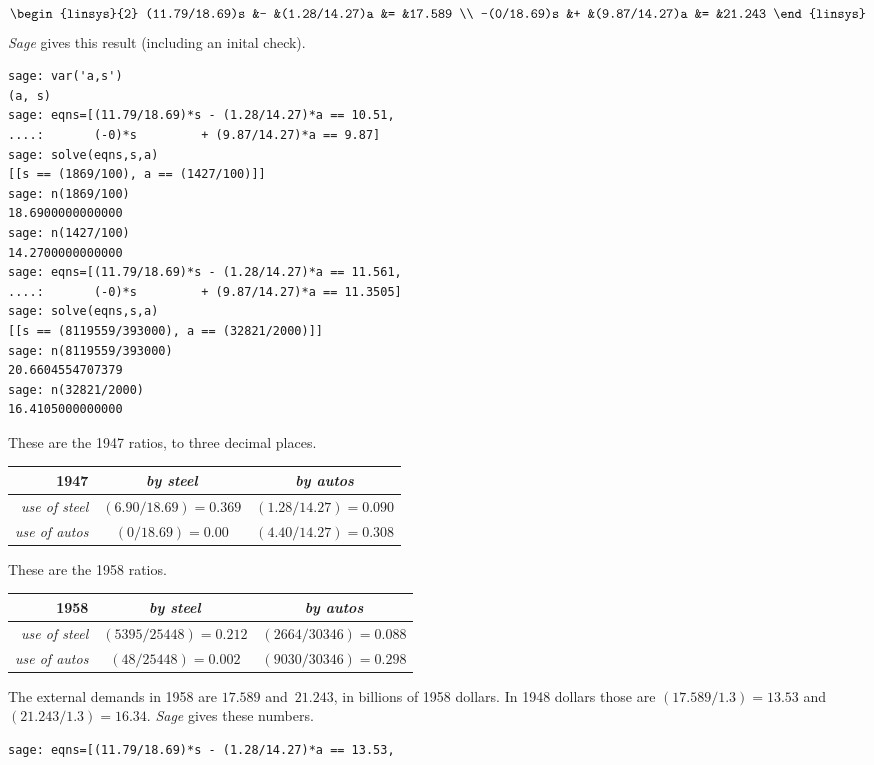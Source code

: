 \begin{exercises}
\begin{answer}
\begin{exparts}
\begin{equation*}
\begin{linsys}{2}
	       (11.79/18.69)s   &-   &(1.28/14.27)a &= &17.589 \\ 
	       -(0/18.69)s   &+   &(9.87/14.27)a &= &21.243 
	    \end{linsys}
	  \end{equation*}
          \textit{Sage} gives this result (including an inital check).
\begin{lstlisting}
sage: var('a,s')
(a, s)
sage: eqns=[(11.79/18.69)*s - (1.28/14.27)*a == 10.51,
....:       (-0)*s         + (9.87/14.27)*a == 9.87]
sage: solve(eqns,s,a)
[[s == (1869/100), a == (1427/100)]]
sage: n(1869/100)
18.6900000000000
sage: n(1427/100)
14.2700000000000
sage: eqns=[(11.79/18.69)*s - (1.28/14.27)*a == 11.561,
....:       (-0)*s         + (9.87/14.27)*a == 11.3505]
sage: solve(eqns,s,a)
[[s == (8119559/393000), a == (32821/2000)]]
sage: n(8119559/393000)
20.6604554707379
sage: n(32821/2000)
16.4105000000000            
\end{lstlisting}
	\partsitem
          These are the 1947 ratios, to three decimal places.
	  \begin{center}
            \begin{tabular}{r|cc}
               1947   &\textit{by steel}  &\textit{by autos}  \\ \hline
               \textit{use of steel}  &$(6.90/18.69)=0.369$ &$(1.28/14.27)=0.090$  \\
               \textit{use of autos}  &$(0/18.69)=0.00$ &$(4.40/14.27)=0.308$  
            \end{tabular}
          \end{center}
          These are the 1958 ratios.
          \begin{center}
            \begin{tabular}{r|cc}
               1958           &\textit{by steel}  &\textit{by autos}  \\ \hline
               \textit{use of steel}  &$(5395/25448)=0.212$ &$(2664/30346)=0.088$  \\
               \textit{use of autos}  &$(48/25448)=0.002$ &$(9030/30346)=0.298$  
            \end{tabular}
          \end{center}
	\partsitem
          The external demands in 1958 are $17.589$ and~$21.243$,
          in billions of 1958 dollars.
          In 1948 dollars those are $(17.589/1.3)=13.53$ and
          $(21.243/1.3)=16.34$. 
          \textit{Sage} gives these numbers.
\begin{lstlisting}
sage: eqns=[(11.79/18.69)*s - (1.28/14.27)*a == 13.53,

\end{lstlisting}
\end{exparts}
\end{answer}
\end{exercises}
